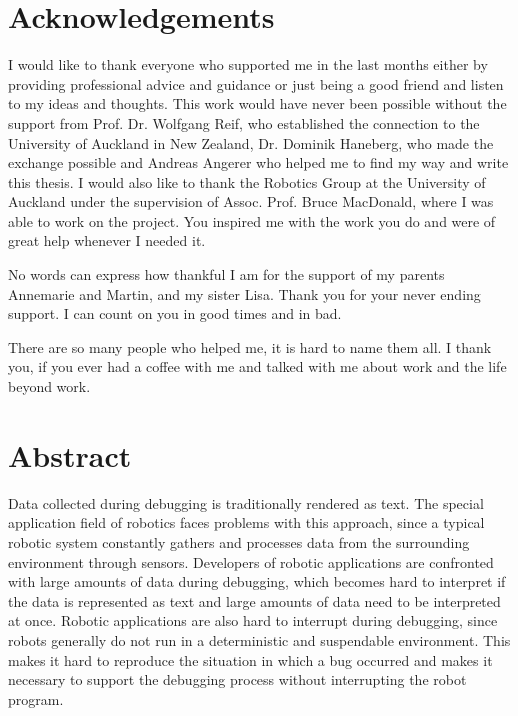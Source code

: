 \documentclass[12pt,a4paper,headsepline,footsepline,DIV13,BCOR12mm]{scrbook}
\begin{document}
 
\newpage

\renewcommand{\baselinestretch}{2} %


\chapter*{Acknowledgements}
I would like to thank everyone who supported me in the last months either by providing professional advice and guidance or just being a good friend and listen to my ideas and thoughts. This work would have never been possible without the support from Prof. Dr. Wolfgang Reif, who established the connection to the University of Auckland in New Zealand, Dr. Dominik Haneberg, who made the exchange possible and Andreas Angerer who helped me to find my way and write this thesis. I would also like to thank the Robotics Group at the University of Auckland under the supervision of Assoc. Prof. Bruce MacDonald, where I was able to work on the project. You inspired me with the work you do and were of great help whenever I needed it.

No words can express how thankful I am for the support of my parents Annemarie and Martin, and my sister Lisa. Thank you for your never ending support. I can count on you in good times and in bad.

There are so many people who helped me, it is hard to name them all. I thank you, if you ever had a coffee with me and talked with me about work and the life beyond work.

\newpage
\chapter*{Abstract}
Data collected during debugging is traditionally rendered as text. The special application field of robotics faces problems with this approach, since a typical robotic system constantly gathers and processes data from the surrounding environment through sensors. Developers of robotic applications are confronted with large amounts of data during debugging, which becomes hard to interpret if the data is represented as text and large amounts of data need to be interpreted at once. Robotic applications are also hard to interrupt during debugging, since robots generally do not run in a deterministic and suspendable environment. This makes it hard to reproduce the situation in which a bug occurred and makes it necessary to support the debugging process without interrupting the robot program.
\end{document}
